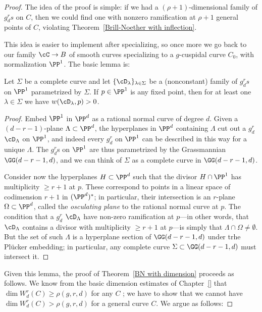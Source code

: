 \begin{proof}
The idea of the proof is simple: if we had a $(\rho+1)$-dimensional family of $g^r_ds$ on $C$, then we could find one with nonzero ramification at $\rho+1$ general points of $C$, violating Theorem~\ref{Brill-Noether with inflection}. 

This idea is easier to implement after specializing, so once more we go back to our family $\cC \to B$ of smooth curves specializing to a $g$-cuspidal curve $C_0$, with normalization $\PP^1$. The basic lemma is:

\begin{lemma}\label{forced ramification}
Let $\Sigma$ be a complete curve and let $\{ \cD_\lambda \}_{\lambda \in \Sigma}$ be a (nonconstant) family of $g^r_ds$ on $\PP^1$ parametrized by $\Sigma$. If $p \in \PP^1$ is any fixed point, then for at least one $\lambda \in \Sigma$ we have $w(\cD_\lambda,p)>0$.
\end{lemma}

\begin{proof}
Embed $\PP^1$ in $\PP^d$ as a rational normal curve of degree $d$. Given a $(d-r-1)$-plane $\Lambda \subset \PP^d$, the hyperplanes in $\PP^d$ containing $\Lambda$ cut out a $g^r_d$ $\cD_\Lambda$ on $\PP^1$, and indeed every $g^r_d$ on $\PP^1$ can be described in this way for a unique $\Lambda$. The $g^r_d$s on $\PP^1$ are thus parametrized by the Grassmannian $\GG(d-r-1,d)$, and we can think of $\Sigma$ as a complete curve in $\GG(d-r-1,d)$.

Consider now the hyperplanes $H \subset \PP^d$ such that the divisor $H \cap \PP^1$ has multiplicity $\geq r+1$ at $p$. These correspond to points in a linear space of codimension $r+1$ in $(\PP^d)^*$; in particular, their intersection is an $r$-plane $\Omega \subset \PP^d$, called the \emph{osculating plane} to the rational normal curve at $p$. The condition that a  $g^r_d$ $\cD_\Lambda$ have non-zero ramification at $p$---in other words, that $\cD_\Lambda$ contains a divisor with multiplicity $\geq r+1$ at $p$---is simply that $\Lambda \cap \Omega \neq \emptyset$. But the set of such $\Lambda$ is a hyperplane section of $\GG(d-r-1,d)$ under trhe Pl\"ucker embedding; in particular, any complete curve $\Sigma \subset \GG(d-r-1,d)$ must intersect it.
\end{proof}

Given this lemma, the proof of Theorem~\ref{BN with dimension} proceeds as follows. We know from the basic dimension estimates of Chapter~\ref{} that $\dim W^r_d(C) \geq \rho(g,r,d)$ for any $C$ ; we have to show that we cannot have $\dim W^r_d(C) > \rho(g,r,d)$ for a general curve $C$. We argue as follows:


\end{proof}
